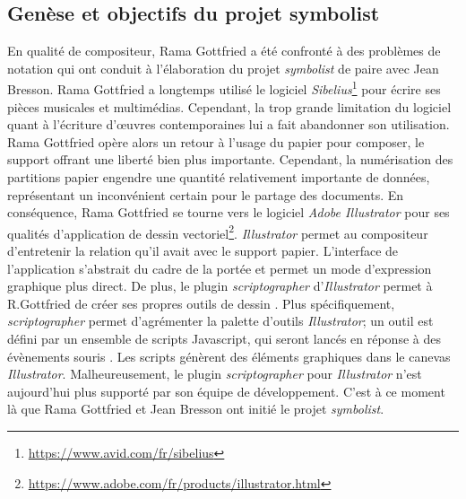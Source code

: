 \subsection{Genèse et objectifs du projet symbolist}
\label{subsec:geneseSymbolist}
En qualité de compositeur, Rama Gottfried a été confronté à des problèmes de notation qui ont conduit à l'élaboration du projet \textit{symbolist} de paire avec Jean Bresson.
Rama Gottfried a longtemps utilisé le logiciel \textit{Sibelius}\footnote{\url{https://www.avid.com/fr/sibelius}} pour écrire ses pièces musicales et multimédias. Cependant, la trop grande limitation du logiciel quant à l'écriture d'œuvres contemporaines lui a fait abandonner son utilisation. 
Rama Gottfried opère alors un retour à l'usage du papier pour composer, le support offrant une liberté bien plus importante. Cependant, la numérisation des partitions \og papier \fg engendre une quantité relativement importante de données, représentant un inconvénient certain pour le partage des documents.
En conséquence, Rama Gottfried se tourne vers le logiciel \textit{Adobe Illustrator} pour ses qualités d'application de dessin vectoriel\footnote{\url{https://www.adobe.com/fr/products/illustrator.html}}. \textit{Illustrator} permet au compositeur d'entretenir la relation qu'il avait avec le support papier. L'interface de l'application s'abstrait du cadre de la portée et permet un mode d'expression graphique plus direct. De plus, le plugin \textit{scriptographer} d'\textit{Illustrator} permet à R.Gottfried de créer ses propres outils de dessin \cite{scriptographer2018}. Plus spécifiquement, \textit{scriptographer} permet d'agrémenter la palette d'outils \textit{Illustrator}; un outil est défini par un ensemble de scripts Javascript, qui seront lancés en réponse à des évènements \og souris \fg. Les scripts génèrent des éléments graphiques dans le canevas \textit{Illustrator}. Malheureusement, le plugin \textit{scriptographer} pour \textit{Illustrator} n'est aujourd'hui plus supporté par son équipe de développement. C'est à ce moment là que Rama Gottfried et Jean Bresson ont initié le projet \textit{symbolist}.

